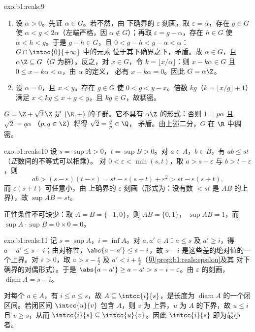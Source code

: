 \begin{solution}{exo:b1:reals:9}
\begin{enumerate}
  \item 设 $\alpha > 0$。先证 $\alpha \in G$。若不然，由
        下确界的 $\varepsilon$ 刻画，取
        $\varepsilon = \alpha$，存在 $g \in G$ 使 $\alpha < g <
        2\alpha$（左端严格，因 $\alpha \notin G$）；再取
        $\varepsilon = g - \alpha$，存在 $h \in G$ 使
        $\alpha < h < g$。于是 $g - h \in G$，且 $0 < g - h < g -
        \alpha < \alpha$：$G \cap \intoo{0}{+\infty}$ 中的元素
        位于其下确界之下，矛盾。故 $\alpha \in G$，且 $\alpha\Z
        \subseteq G$（$G$ 为群）。反之，对 $x \in G$，令
        $k = \lfloor x/\alpha \rfloor$：则 $x - k\alpha \in G$ 且
        $0 \leq x - k\alpha < \alpha$，由 $\alpha$ 的定义，
        必有 $x - k\alpha = 0$。因此 $G = \alpha\Z$。
  \item 设 $\alpha = 0$，且 $x < y$。存在 $g \in G$
        使 $0 < g < y - x$。倍数 $kg$（$k = \lfloor x/g
        \rfloor + 1$）满足 $x < kg \leq x + g < y$，且 $kg \in
        G$，故稠密。
\end{enumerate}
$G = \Z + \sqrt 2\,\Z$ 是 $(\R, +)$ 的子群。它不具有
$\alpha\Z$ 的形式：否则 $1 = p\alpha$ 且 $\sqrt 2 = q\alpha$
（$p, q \in \Z$）将得 $\sqrt 2 = \frac qp \in \Q$，
矛盾。由上述二分，$G$ 在 $\R$ 中稠密。
\end{solution}

\begin{solution}{exo:b1:reals:10}
设 $s = \sup A > 0$，$t = \sup B > 0$。对 $a \in A$，$b \in B$，有 $ab
\leq st$（\emph{正}数间的不等式可以相乘）。
对 $0 < \varepsilon < \min(s, t)$，取 $a > s - \varepsilon$ 与
$b > t - \varepsilon$，则
\[
ab > (s - \varepsilon)(t - \varepsilon)
= st - \varepsilon(s + t) + \varepsilon^2
> st - \varepsilon (s + t),
\]
而 $\varepsilon(s+t)$ 可任意小，由
上确界的 $\varepsilon$ 刻画（形式为：没有数 $< st$ 是
$AB$ 的上界），故 $\sup AB = st$。

正性条件不可缺少：取 $A = B = \{-1, 0\}$，则 $AB = \{0, 1\}$，
$\sup AB = 1$，而 $\sup A \cdot \sup B = 0 \times 0 = 0$。
\end{solution}

\begin{solution}{exo:b1:reals:11}
记 $s = \sup A$，$i = \inf A$。对 $a, a' \in A$：$a \leq s$
及 $a' \geq i$，得 $a - a' \leq s - i$；由对称性，$\abs{a -
a'} \leq s - i$，故 $s - i$ 是这些差的绝对值的一个上界。对
$\varepsilon > 0$，取 $a > s - \frac\varepsilon2$ 及 $a' < i
+ \frac\varepsilon2$（见\cref{prop:b1:reals:epsilon}及其
对下确界的对偶形式）。于是 $\abs{a - a'} \geq a - a' > s - i -
\varepsilon$。由 $\varepsilon$ 的刻画，
$\operatorname{diam} A = s - i$。

对每个 $a \in A$，有 $i \leq a \leq s$，故 $A \subseteq
\intcc{i}{s}$，是长度为 $\operatorname{diam}
A$ 的一个闭区间。若闭区间 $\intcc{u}{v}$ 包含 $A$，则 $v$ 为
上界，$u$ 为 $A$ 的下界，故 $u \leq i$ 且 $v
\geq s$，从而 $\intcc{i}{s} \subseteq \intcc{u}{v}$。因此
$\intcc{i}{s}$ 即为最小者。
\end{solution}

